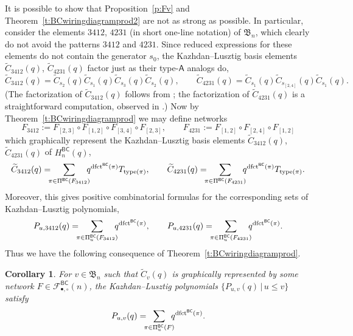 \documentclass[12pt]{amsart}
\newtheorem{cor}[thm]{Corollary}
\theoremstyle{definition}
\numberwithin{equation}{section}
\newcommand{\bn}{\mathfrak{B}_n}
\newcommand{\hbnq}{H_n^{\msfBC}(q)}
\newcommand{\wtc}[2]{\widetilde{C}_{#1}(#2)}
\newcommand{\defeq}{:=}
\newcommand{\dfct}{\mathrm{dfct}}
\newcommand{\type}{\mathrm{type}}
\newcommand{\avoidp}{avoid the patterns $3412$ and $4231${}}
\newcommand{\nTksp}{\negthickspace\negthickspace}
\newcommand{\PiBC}{\Pi^{\msfBC}}
\newcommand{\bcnet}[2]{\mathcal F^{\mathsf{#1}}_{\bullet,\circ}(#2)}
\newcommand{\msfA}{\mathsf{A}}
\newcommand{\msfBC}{\mathsf{BC}}
\begin{document}
It is possible to show that Proposition~\ref{p:Fv} and Theorem~\ref{t:BCwiringdiagramprod2} are not as strong as possible.  In particular, consider
the elements $3412$, $4231$ (in short one-line notation) of $\bn$, which clearly do not \avoidp.
Since 
reduced expressions for these elements do not contain the generator $s_0$, the %
Kazhdan--Lusztig basis elements $\wtc{3412}q$, $\wtc{4231}q$ factor just as their type-$\msfA$ analogs do, %
\begin{equation*}
    \wtc{3412}q = \wtc{s_2}q \wtc{s_1}q \wtc{s_3}q \wtc{s_2}q, \qquad
    \wtc{4231}q = \wtc{s_1}q \wtc{s_{[2,4]}}q \wtc{s_1}q.
\end{equation*}
(The factorization of $\wtc{3412}q$ follows from \cite[Thm.\,1]{BWHex}; the factorization of $\wtc{4231}q$ is a straightforward computation, observed in \cite[\S 4]{SkanNNDCB}.)
Now by Theorem~\ref{t:BCwiringdiagramprod} we may define networks
\begin{equation}\label{eq:patternstarnetworks}
F_{3412} \defeq F_{[2,3]} \circ F_{[1,2]} \circ F_{[3,4]} \circ F_{[2,3]},
\qquad
F_{4231} \defeq F_{[1,2]} \circ F_{[2,4]} \circ F_{[1,2]}
\end{equation}
which graphically represent
the Kazhdan--Lusztig basis elements
$\wtc{3412}q$, $\wtc{4231}q$ of $\hbnq$,
\begin{equation*}
    \wtc{3412}q = \nTksp \sum_{\pi \in \PiBC(F_{3412})} \nTksp
    q^{\dfct^{\msfBC}(\pi)}T_{\type(\pi)}, \qquad
    \wtc{4231}q = \nTksp \sum_{\pi \in \PiBC(F_{4231})} \nTksp
    q^{\dfct^{\msfBC}(\pi)}T_{\type(\pi)}. 
\end{equation*}
Moreover, this gives positive combinatorial formulas for the corresponding sets of  Kazhdan--Lusztig polynomials,
\begin{equation*}
    P_{u,3412}(q) = \nTksp \sum_{\pi \in \PiBC_u(F_{3412})}\nTksp q^{\dfct^{\msfBC}(\pi)}, 
    \qquad
    P_{u,4231}(q) = \nTksp \sum_{\pi \in \PiBC_u(F_{4231})}\nTksp q^{\dfct^{\msfBC}(\pi)}.
\end{equation*}
Thus we have the following consequence of Theorem~\ref{t:BCwiringdiagramprod}.

\begin{cor}\label{c:KLinterp}
    For $v \in \bn$ such that $\wtc vq$ is graphically represented by some network $F \in \bcnet{\msfBC} n$, the Kazhdan--Lusztig polynomials $\{ P_{u,v}(q) \,|\, u \leq v \}$ satisfy
    \begin{equation*}
        P_{u,v}(q) = \nTksp \sum_{\pi \in \PiBC_u(F)} \nTksp q^{\dfct^{\msfBC}(\pi)}.
    \end{equation*}
\end{cor}
\end{document}
